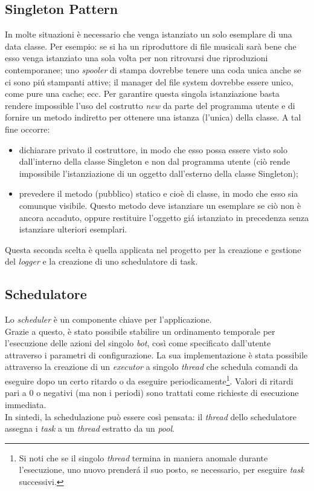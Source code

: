 \vspace*{0.5cm}
\subsection{Singleton Pattern}
In molte situazioni \`e necessario che venga istanziato un solo esemplare di una data classe. Per esempio: se si ha un riproduttore di file musicali sar\`a bene che esso venga istanziato una sola volta per non ritrovarsi due riproduzioni contemporanee; uno \textit{spooler} di stampa dovrebbe tenere una coda unica anche se ci sono pi\'u
stampanti attive; il manager del file system dovrebbe essere unico, come pure una cache; ecc. Per garantire questa singola istanziazione basta rendere impossible l'uso del costrutto \textit{new} da parte del programma utente e di fornire un metodo indiretto per ottenere una istanza (l'unica) della classe.
A tal fine occorre:
\begin{itemize}
\item dichiarare privato il costruttore, in modo che esso possa essere visto solo dall'interno della classe Singleton e non dal programma utente (ci\`o rende impossibile l'istanziazione di un oggetto dall'esterno della classe Singleton);
\item prevedere il metodo (pubblico) statico e cio\`e di classe, in modo che esso sia comunque visibile. Questo metodo deve istanziare un esemplare se ci\`o non \`e ancora accaduto, oppure restituire l'oggetto gi\'a istanziato in precedenza senza istanziare ulteriori esemplari.
\end{itemize}
Questa seconda scelta \`e quella applicata nel progetto per la creazione e gestione del \textit{logger} e la creazione di uno schedulatore di task.

\vspace*{0.5cm}
\subsection{Schedulatore}
Lo \textit{scheduler} \`e un componente chiave per l'applicazione. \\
Grazie a questo, \`e stato possibile stabilire un ordinamento temporale per l'esecuzione delle azioni del singolo \textit{bot}, cos\`i come specificato dall'utente attraverso i parametri di configurazione. La sua implementazione \`e stata possibile attraverso la creazione di un \textit{executor} a singolo \textit{thread} che schedula comandi da eseguire dopo un certo ritardo o da eseguire periodicamente\footnote{Si noti che se il singolo \textit{thread} termina in maniera anomale durante l'esecuzione, uno nuovo prender\'a il suo posto, se necessario, per eseguire \textit{task} successivi.}. Valori di ritardi pari a 0 o negativi (ma non i periodi) sono trattati come richieste di esecuzione immediata. \\
In sintedi, la schedulazione pu\`o essere cos\`i pensata: il \textit{thread} dello schedulatore assegna i \textit{task} a un \textit{thread} estratto da un \textit{pool}.

